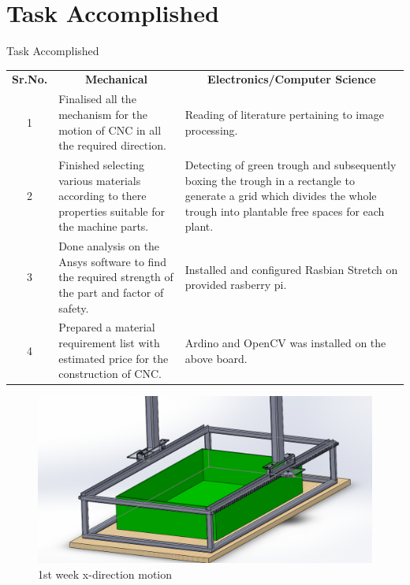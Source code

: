 \documentclass[12pt, a4paper]{beamer}
\begin{document}
\section{Task Accomplished}
	\begin{frame}{Task Accomplished}

\begin{table}[htbp]
  \centering
  \tiny
    \begin{tabular}{cp{12em}l}
    \textbf{Sr.No.} & \multicolumn{1}{c}{\textbf{Mechanical}} & \multicolumn{1}{c}{\textbf{Electronics/Computer Science}} \\
    1     & Finalised all the mechanism for the motion of CNC in all the required direction. & Reading of literature pertaining to image processing. \\
    2     & Finished selecting various materials according to there properties suitable for the machine parts. & \multicolumn{1}{p{24.43em}}{Detecting of green trough and subsequently boxing the trough in a rectangle to generate a grid which divides the whole trough into plantable free spaces for each plant.} \\
    3     & Done analysis on the Ansys software to find the required strength of the part and factor of safety. & \multicolumn{1}{p{24.43em}}{Installed and configured Rasbian Stretch on provided rasberry pi.} \\
    4     & Prepared a material requirement list with estimated price for the construction of CNC. & Ardino and OpenCV was installed on the above board. \\
    \end{tabular}%
  \label{tab:addlabel}%
\end{table}%

\end{frame}

	\begin{frame}
		\begin{figure}
		\begin{center}
		\includegraphics[width=\textwidth]{1.png}
		\caption{1st week x-direction motion}
		\end{center}
		\end{figure}
	\end{frame}
	
\end{document}
